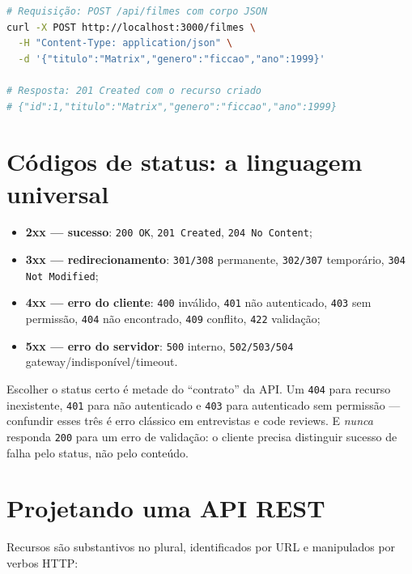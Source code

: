 \begin{lstlisting}[style=livro, language=Bash, caption={Requisição e resposta via curl.}, label={list:http-curl}]
# Requisição: POST /api/filmes com corpo JSON
curl -X POST http://localhost:3000/filmes \
  -H "Content-Type: application/json" \
  -d '{"titulo":"Matrix","genero":"ficcao","ano":1999}'

# Resposta: 201 Created com o recurso criado
# {"id":1,"titulo":"Matrix","genero":"ficcao","ano":1999}
\end{lstlisting}

\section{Códigos de status: a linguagem universal}

\begin{itemize}[leftmargin=*, itemsep=0.3em]
  \item \textbf{2xx — sucesso}: \texttt{200 OK}, \texttt{201 Created}, \texttt{204 No Content};
  \item \textbf{3xx — redirecionamento}: \texttt{301/308} permanente, \texttt{302/307} temporário, \texttt{304 Not Modified};
  \item \textbf{4xx — erro do cliente}: \texttt{400} inválido, \texttt{401} não autenticado, \texttt{403} sem permissão, \texttt{404} não encontrado, \texttt{409} conflito, \texttt{422} validação;
  \item \textbf{5xx — erro do servidor}: \texttt{500} interno, \texttt{502/503/504} gateway/indisponível/timeout.
\end{itemize}

\begin{caixaconceito}
Escolher o status certo é metade do ``contrato'' da API. Um \texttt{404} para
recurso inexistente, \texttt{401} para não autenticado e \texttt{403} para
autenticado sem permissão — confundir esses três é erro clássico em
entrevistas e code reviews. E \emph{nunca} responda \texttt{200} para um erro
de validação: o cliente precisa distinguir sucesso de falha pelo status, não
pelo conteúdo.
\end{caixaconceito}

\section{Projetando uma API REST}

Recursos são substantivos no plural, identificados por URL e manipulados por
verbos HTTP:


